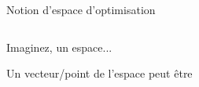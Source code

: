 \documentclass[9pt, aspectratio=169]{beamer}
\begin{document}
\begin{frame}{Notion d'espace d'optimisation} %

\begin{columns}
    \begin{column}{0.58\textwidth}
    
	Imaginez, un espace...
	\begin{figure}
	\end{figure}

	Un vecteur/point de l'espace peut être


	\end{column}
    \begin{column}{0.4\textwidth}
	

\end{column}
\end{columns}
\end{frame}
\end{document}
